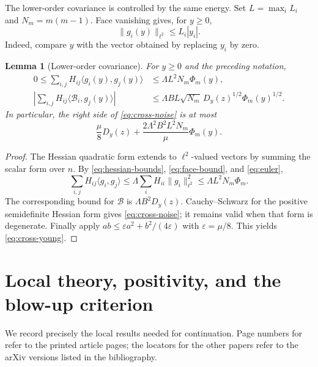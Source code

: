 \documentclass[11pt]{amsart}
\newtheorem{lemma}[theorem]{Lemma}
\theoremstyle{definition}
\newcommand{\ellTwo}{\ell^2}
\numberwithin{equation}{section}
\begin{document}
The lower-order covariance is controlled by the same energy. Set
$L=\max_iL_i$ and $N_m=m(m-1)$. Face vanishing gives, for $y\geq0$,
\begin{equation}\label{eq:face-bound}
\|g_i(y)\|_{\ellTwo}
 \leq L_i|y_i|.
\end{equation}
Indeed, compare $y$ with the vector obtained by replacing $y_i$ by zero.

\begin{lemma}[Lower-order covariance]\label{lem:lower-noise}
For $y\geq0$ and the preceding notation,
\begin{align}
0\leq\sum_{i,j}H_{ij}\langle g_i(y),g_j(y)\rangle
 &\leq\Lambda L^2N_m\Phi_m(y),\label{eq:noise-trace}\\
\left|\sum_{i,j}H_{ij}\langle\mathcal B_i,g_j(y)\rangle\right|
 &\leq\Lambda BL\sqrt{N_m}\,D_y(z)^{1/2}\Phi_m(y)^{1/2}.
 \label{eq:cross-noise}
\end{align}
In particular, the right side of \eqref{eq:cross-noise} is at most
\begin{equation}\label{eq:cross-young}
\frac\mu8D_y(z)+\frac{2\Lambda^2B^2L^2N_m}{\mu}\Phi_m(y).
\end{equation}
\end{lemma}
\begin{proof}
The Hessian quadratic form extends to $\ellTwo$-valued vectors by
summing the scalar form over $n$. By \eqref{eq:hessian-bounds},
\eqref{eq:face-bound}, and \eqref{eq:euler},
\[
\sum_{i,j}H_{ij}\langle g_i,g_j\rangle
 \leq\Lambda\sum_iH_{ii}\|g_i\|_{\ellTwo}^2
 \leq\Lambda L^2N_m\Phi_m.
\]
The corresponding bound for $\mathcal B$ is $\Lambda B^2D_y(z)$.
Cauchy--Schwarz for the positive semidefinite Hessian form gives
\eqref{eq:cross-noise}; it remains valid when that form is degenerate.
Finally apply $ab\leq\varepsilon a^2+b^2/(4\varepsilon)$ with
$\varepsilon=\mu/8$. This yields \eqref{eq:cross-young}.
\end{proof}

\section{Local theory, positivity, and the blow-up criterion}\label{sec:local}

We record precisely the local results needed for continuation. Page
numbers for \cite{AVsurvey} refer to the printed article pages; the
locators for the other papers refer to the arXiv versions listed in the
bibliography.
\end{document}
